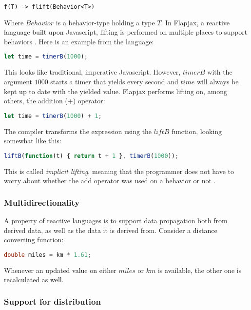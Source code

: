 \begin{lstlisting}
f(T) -> flift(Behavior<T>)
\end{lstlisting}

Where $Behavior$ is a behavior-type holding a type $T$. In Flapjax, a reactive
language built upon Javascript, lifting is performed on multiple places to
support behaviors \cite{meyerovich2009flapjax}. Here is an example from the
language:

\begin{lstlisting}[language=javascript]
let time = timerB(1000);
\end{lstlisting}

This looks like traditional, imperative Javascript. However, $timerB$ with the
argument $1000$ starts a timer that yields every second and $time$ will always
be kept up to date with the yielded value. Flapjax performs lifting on, among
others, the addition ($+$) operator:


\begin{lstlisting}[language=javascript]
let time = timerB(1000) + 1;
\end{lstlisting}

The compiler transforms the expression using the $liftB$ function, looking
somewhat like this:

\begin{lstlisting}[language=javascript]
liftB(function(t) { return t + 1 }, timerB(1000));
\end{lstlisting}

This is called \textit{implicit lifting}, meaning that the programmer does not
have to worry about whether the add operator was used on a behavior or not
\cite{bainomugisha2013survey}.

\subsubsection{Multidirectionality}

A property of reactive languages is to support data propagation both from
derived data, as well as the data it is derived from. Consider a distance
converting function:

\begin{lstlisting}[language=C]
double miles = km * 1.61;
\end{lstlisting}

Whenever an updated value on either $miles$ or $km$ is available, the other one
is recalculated as well.

\subsubsection{Support for distribution}

